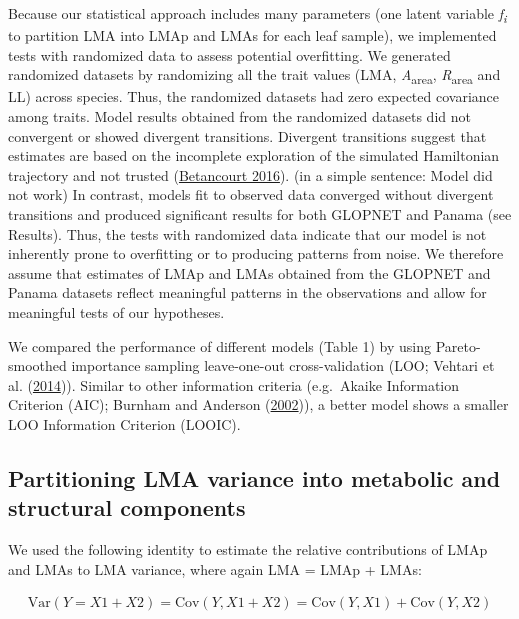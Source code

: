 \documentclass[
  12pt,
]{article}
\begin{document}
Because our statistical approach includes many parameters (one latent variable \emph{f\textsubscript{i}} to partition LMA into LMAp and LMAs for each leaf sample), we implemented tests with randomized data to assess potential overfitting.
We generated randomized datasets by randomizing all the trait values (LMA, \emph{A}\textsubscript{area}, \emph{R}\textsubscript{area} and LL) across species.
Thus, the randomized datasets had zero expected covariance among traits.
Model results obtained from the randomized datasets did not convergent or showed divergent transitions.
Divergent transitions suggest that estimates are based on the incomplete exploration of the simulated Hamiltonian trajectory and not trusted (\protect\hyperlink{ref-Betancourt2016}{Betancourt 2016}).
(in a simple sentence: Model did not work)
In contrast, models fit to observed data converged without divergent transitions and produced significant results for both GLOPNET and Panama (see Results).
Thus, the tests with randomized data indicate that our model is not inherently prone to overfitting or to producing patterns from noise.
We therefore assume that estimates of LMAp and LMAs obtained from the GLOPNET and Panama datasets reflect meaningful patterns in the observations and allow for meaningful tests of our hypotheses.

We compared the performance of different models (Table 1) by using Pareto-smoothed importance sampling leave-one-out cross-validation (LOO; Vehtari et al. (\protect\hyperlink{ref-Vehtari2014}{2014})).
Similar to other information criteria (e.g.~Akaike Information Criterion (AIC); Burnham and Anderson (\protect\hyperlink{ref-Burnham2002}{2002})), a better model shows a smaller LOO Information Criterion (LOOIC).

\hypertarget{partitioning-lma-variance-into-metabolic-and-structural-components}{%
\subsection{Partitioning LMA variance into metabolic and structural components}\label{partitioning-lma-variance-into-metabolic-and-structural-components}}

We used the following identity to estimate the relative contributions of LMAp and LMAs to LMA variance, where again LMA = LMAp + LMAs:

\begin{align}
\mathrm{Var}(Y = X1 + X2) = \mathrm{Cov}(Y, X1+X2) = \mathrm{Cov}(Y,X1) + \mathrm{Cov}(Y,X2) \tag{7}
\end{align}
\end{document}
